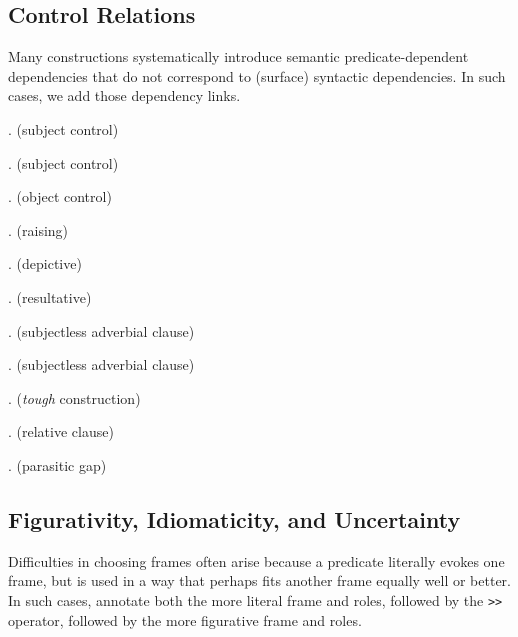 \documentclass[a4paper]{article}
\begin{document}
\newpage\subsection{Control Relations}
\label{sec:control}


Many constructions systematically introduce semantic predicate-dependent
dependencies that do not correspond to (surface) syntactic dependencies. In such cases, we add those dependency links.

\ex. (subject control)

\ex. (subject control)

\ex. (object control)

\ex. (raising)

\ex. (depictive)

\ex. (resultative)

\ex. (subjectless adverbial clause)

\ex. (subjectless adverbial clause)

\ex. (\emph{tough} construction)

\ex. (relative clause)

\ex. (parasitic gap)

\newpage\subsection{Figurativity, Idiomaticity, and Uncertainty}

Difficulties in choosing frames often arise because a predicate literally evokes
one frame, but is used in a way that perhaps fits another frame equally well or
better. In such cases, annotate both the more literal frame and roles, followed
by the \texttt{>}\texttt{>} operator, followed by the more figurative frame and
roles.
\end{document}
